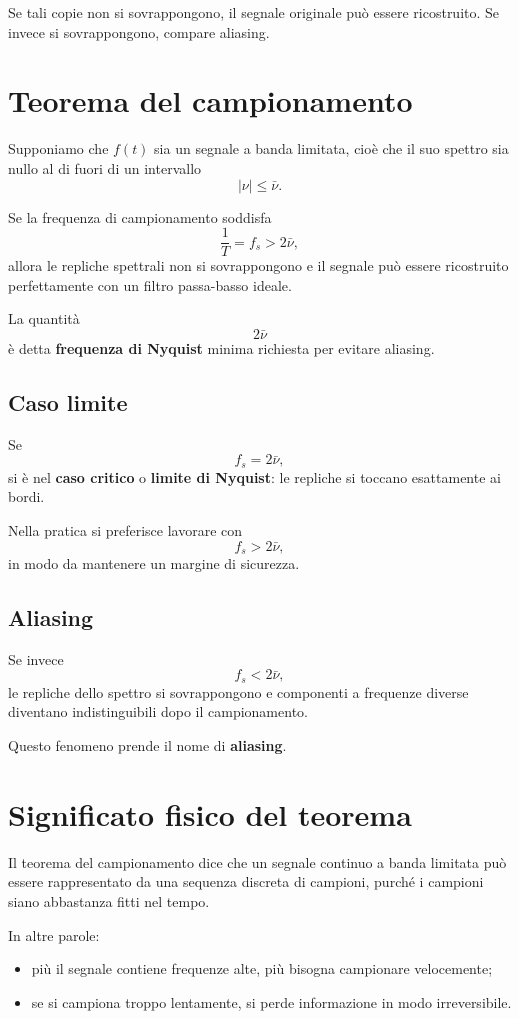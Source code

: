 Se tali copie non si sovrappongono, il segnale originale può essere ricostruito.
Se invece si sovrappongono, compare aliasing.

\section{Teorema del campionamento}

Supponiamo che \(f(t)\) sia un segnale a banda limitata, cioè che il suo spettro sia nullo
al di fuori di un intervallo
\[
|\nu|\leq \bar{\nu}.
\]

Se la frequenza di campionamento soddisfa
\[
\frac{1}{T}=f_s > 2\bar{\nu},
\]
allora le repliche spettrali non si sovrappongono e il segnale può essere ricostruito
perfettamente con un filtro passa-basso ideale.

La quantità
\[
2\bar{\nu}
\]
è detta \textbf{frequenza di Nyquist} minima richiesta per evitare aliasing.

\subsection{Caso limite}

Se
\[
f_s = 2\bar{\nu},
\]
si è nel \textbf{caso critico} o \textbf{limite di Nyquist}:
le repliche si toccano esattamente ai bordi.

Nella pratica si preferisce lavorare con
\[
f_s > 2\bar{\nu},
\]
in modo da mantenere un margine di sicurezza.

\subsection{Aliasing}

Se invece
\[
f_s < 2\bar{\nu},
\]
le repliche dello spettro si sovrappongono e componenti a frequenze diverse
diventano indistinguibili dopo il campionamento.

Questo fenomeno prende il nome di \textbf{aliasing}.

\section{Significato fisico del teorema}

Il teorema del campionamento dice che un segnale continuo a banda limitata
può essere rappresentato da una sequenza discreta di campioni, purché i campioni
siano abbastanza fitti nel tempo.

In altre parole:
\begin{itemize}
    \item più il segnale contiene frequenze alte, più bisogna campionare velocemente;
    \item se si campiona troppo lentamente, si perde informazione in modo irreversibile.
\end{itemize}

